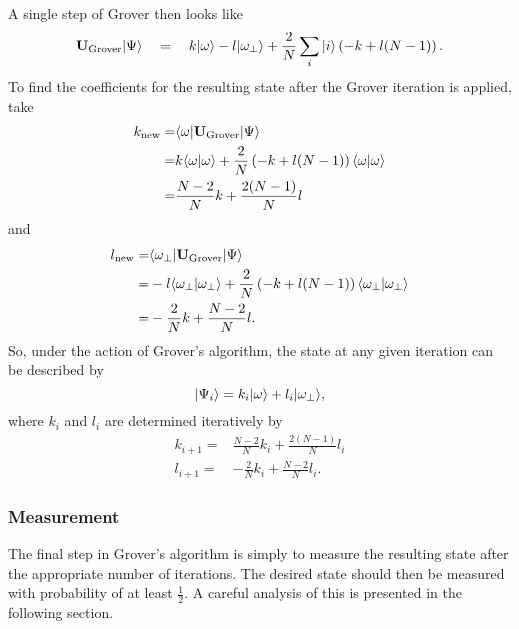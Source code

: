 A single step of Grover then looks like
\begin{equation}
{\bf U}_{\text{Grover}}{|{\Psi}\rangle}
\quad =\quad 
                k{|{\omega}\rangle} - l{|{\omega_\perp}\rangle}
                + \frac{2}{N} \sum_i {|{i}\rangle} \left(
                                    - k + l(N-1)
                              \right).
\end{equation}
To find the coefficients for the resulting state after 
the Grover iteration is applied, take
\begin{equation}
\begin{split}
k_{\text{new}} =& {\langle{\omega}|}{\bf U}_{\text{Grover}}{|{\Psi}\rangle}\\
=& k{\langle{\omega}|{\omega}\rangle} + \frac{2}{N} \left( -k + l(N-1) \right)
{\langle{\omega}|{\omega}\rangle}\\
=& \frac{N-2}{N}k + \frac{2(N-1)}{N}l
\end{split}
\end{equation}
and 
\begin{equation}
\begin{split}
l_{\text{new}} =& {\langle{\omega_\perp}|}{\bf U}_{\text{Grover}}{|{\Psi}\rangle}\\
=& -l{\langle{\omega_\perp}|{\omega_\perp}\rangle}
+ \frac{2}{N} \left( -k + l(N-1) \right) {\langle{\omega_\perp}|{\omega_\perp}\rangle}\\
=& -\frac{2}{N}k + \frac{N-2}{N}l.
\end{split}
\end{equation}
So, under the action of Grover's algorithm, the state at any given
iteration can be described by
\begin{equation}
{|{\Psi_i}\rangle} = k_i{|{\omega}\rangle} + l_i{|{\omega_\perp}\rangle},
\end{equation}
where $k_i$ and $l_i$ are determined iteratively by
\begin{equation}
\begin{split}
k_{i+1} =& \frac{N-2}{N}k_i + \frac{2(N-1)}{N}l_i\\
l_{i+1} =& -\frac{2}{N}k_i + \frac{N-2}{N}l_i.
\end{split}
\end{equation}

                
\subsubsection{Measurement}

The final step in Grover's algorithm is simply to measure the
resulting state after the appropriate number of iterations.
The desired state should then be measured with probability of at
least $\frac{1}{2}$.
A careful analysis of this is presented in the following section.


